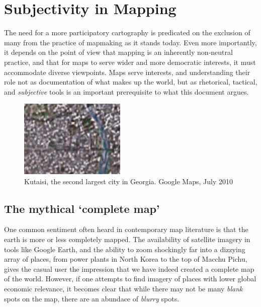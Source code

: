 \documentclass[11pt,oneside,notitlepage]{report}
\begin{document}
{{\chapter{Subjectivity in Mapping}
\label{chap:subjectivity}

The need for a more participatory cartography is predicated on the exclusion of many from the practice of mapmaking as it stands today. Even more importantly, it depends on the point of view that mapping is an inherently non-neutral practice, and that for maps to serve wider and more democratic interests, it must accommodate diverse viewpoints. Maps serve interests, and understanding their role not as documentation of what makes up the world, but as rhetorical, tactical, and \emph{subjective} tools is an important prerequisite to what this document argues.

\begin{figure}
	\begin{flushright}
		\includegraphics[width=0.45\textwidth]{images/kutaisi.png}
	\caption{Kutaisi, the second largest city in Georgia. Google Maps, July 2010}
	\end{flushright}
\end{figure}

\section{The mythical `complete map'}

One common sentiment often heard in contemporary map literature is that the earth is more or less completely mapped. The availability of satellite imagery in tools like Google Earth, and the ability to zoom shockingly far into a dizzying array of places, from power plants in North Korea to the top of Macchu Pichu, gives the casual user the impression that we have indeed created a complete map of the world. However, if one attempts to find imagery of places with lower global economic relevance, it becomes clear that while there may not be many \emph{blank} spots on the map, there are an abundace of \emph{blurry} spots. 

}}
\end{document}
